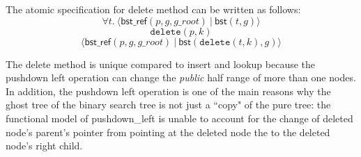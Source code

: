 \documentclass[acmsmall,screen]{acmart}\settopmatter{printfolios=true}
\newcommand{\treerep}{\ensuremath{\mathsf{bst}}}
\newcommand{\nodeboxrep}{\ensuremath{\mathsf{bst\_ref}}}
\begin{document}
The atomic specification for delete method can be written as follows:
$$\forall t.\ \langle \nodeboxrep(p,g,g\_root)\ |\ \treerep(t,g)\rangle $$ 
$$\texttt{delete}(p,k)$$
$$\langle \nodeboxrep(p,g,g\_root)\ |\ \treerep(\texttt{delete}(t, k),g)\rangle $$

The delete method is unique compared to insert and lookup because the pushdown left 
operation can change the \textit{public} half range of more than one nodes. In addition,
the pushdown left operation is one of the main reasons why the ghost tree of the binary
search tree is not just a ``copy" of the pure tree: the functional model of pushdown\_left
is unable to account for the change of deleted node's parent's pointer from pointing
at the deleted node the to the deleted node's right child.



\usetikzlibrary{positioning}
\end{document}
